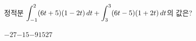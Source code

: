 정적분 $\displaystyle\int_{-1}^{2}(6t+5)(1-2t)\mkern3mu dt+\int_{3}^{3}(6t-5)(1+2t)\mkern3mu dt$의 값은?
\begin{choices32}{$-27$}{$-15$}{$-9$}{$15$}{$27$}\end{choices32}
